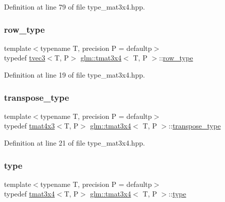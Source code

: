 Definition at line 79 of file type\+\_\+mat3x4.\+hpp.

\mbox{\label{structglm_1_1tmat3x4_a8caa6e2dff35705a17659ac64c6b6782}} 
\subsubsection{\texorpdfstring{row\_type}{row\_type}}
{\footnotesize\ttfamily template$<$typename T, precision P = defaultp$>$ \\
typedef \mbox{\hyperlink{structglm_1_1tvec3}{tvec3}}$<$T, P$>$ \mbox{\hyperlink{structglm_1_1tmat3x4}{glm\+::tmat3x4}}$<$ T, P $>$\+::\mbox{\hyperlink{structglm_1_1tmat3x4_a8caa6e2dff35705a17659ac64c6b6782}{row\+\_\+type}}}



Definition at line 19 of file type\+\_\+mat3x4.\+hpp.

\mbox{\label{structglm_1_1tmat3x4_a2ebc6db4342208ffbd1f3c643bcd81e2}} 
\subsubsection{\texorpdfstring{transpose\_type}{transpose\_type}}
{\footnotesize\ttfamily template$<$typename T, precision P = defaultp$>$ \\
typedef \mbox{\hyperlink{structglm_1_1tmat4x3}{tmat4x3}}$<$T, P$>$ \mbox{\hyperlink{structglm_1_1tmat3x4}{glm\+::tmat3x4}}$<$ T, P $>$\+::\mbox{\hyperlink{structglm_1_1tmat3x4_a2ebc6db4342208ffbd1f3c643bcd81e2}{transpose\+\_\+type}}}



Definition at line 21 of file type\+\_\+mat3x4.\+hpp.

\mbox{\label{structglm_1_1tmat3x4_a5af4a499991893e6f02750a29572fd9a}} 
\subsubsection{\texorpdfstring{type}{type}}
{\footnotesize\ttfamily template$<$typename T, precision P = defaultp$>$ \\
typedef \mbox{\hyperlink{structglm_1_1tmat3x4}{tmat3x4}}$<$T, P$>$ \mbox{\hyperlink{structglm_1_1tmat3x4}{glm\+::tmat3x4}}$<$ T, P $>$\+::\mbox{\hyperlink{structglm_1_1tmat3x4_a5af4a499991893e6f02750a29572fd9a}{type}}}



